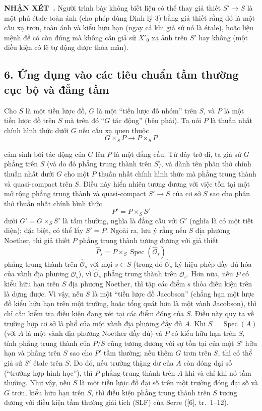 \documentclass[11pt,twoside,openany]{book}
\numberwithin{equation}{section}
\newcommand{\src}[1]{%
  \phantomsection\hypertarget{src:\fgasourceid:#1}{}%
  \marginpar{\raggedleft\footnotesize\sffamily #1}%
}
\newcommand{\fgasourceid}{unset}
\newcommand{\result}[2]{\par\medskip\noindent\textbf{#1\if\relax\detokenize{#2}\relax\else\ #2\fi.}\quad}
\begin{document}
\result{NHẬN XÉT}{} Người trình bày không biết liệu có thể thay giả thiết
$S'\longrightarrow S$ là một phủ étale toàn ánh (cho phép dùng Định lý 3) bằng
giả thiết rằng đó là một cấu xạ trơn, toàn ánh và kiểu hữu hạn (ngay cả khi giả
sử nó là étale), hoặc liệu mệnh đề có còn đúng mà không cần giả sử $X'_0$ xạ
ảnh trên $S'$ hay không (một điều kiện có lẽ tự động được thỏa mãn).

\subsection*{6. Ứng dụng vào các tiêu chuẩn tầm thường cục bộ và đẳng tầm}

Cho $S$ là một tiền lược đồ, $G$ là một ``tiền lược đồ nhóm'' trên $S$, và $P$
là một tiền lược đồ trên $S$ mà trên đó ``$G$ tác động'' (bên phải). Ta nói
$P$ là thuần nhất chính hình thức dưới $G$ nếu cấu xạ quen thuộc
\[
  G\times_SP\longrightarrow P\times_SP
\]

\src{325}
cảm sinh bởi tác động của $G$ lên $P$ là một đẳng cấu. Từ đây trở đi, ta giả
sử $G$ phẳng trên $S$ (và do đó phẳng trung thành trên $S$), và dành tên
phân thớ chính thuần nhất dưới $G$ cho một $P$ thuần nhất chính hình thức
mà phẳng trung thành và quasi-compact trên $S$. Điều này hiển nhiên tương đương
với việc tồn tại một mở rộng phẳng trung thành và quasi-compact
$S'\longrightarrow S$ của cơ sở $S$ sao cho phân thớ thuần nhất chính hình thức
\[
  P'=P\times_SS'
\]
dưới $G'=G\times_SS'$ là tầm thường, nghĩa là đẳng cấu với $G'$ (nghĩa là có
một tiết diện); đặc biệt, có thể lấy $S'=P$. Ngoài ra, lưu ý rằng nếu $S$ địa
phương Noether, thì giả thiết $P$ phẳng trung thành tương đương với
giả thiết
\[
  \widehat P_s=P\times_S\operatorname{Spec}(\widehat{\mathcal O}_s)
\]
phẳng trung thành trên $\widehat{\mathcal O}_s$ với mọi $s\in S$ (trong đó
$\widehat{\mathcal O}_s$ ký hiệu phép đầy đủ hóa của vành địa phương
$\mathcal O_s$), vì $\widehat{\mathcal O}_s$ phẳng trung thành trên
$\mathcal O_s$. Hơn nữa, nếu $P$ có kiểu hữu hạn trên $S$ địa phương Noether,
thì tập các điểm $s$ thỏa điều kiện trên là dựng được. Vì vậy, nếu $S$ là một
``tiền lược đồ Jacobson'' (chẳng hạn một lược đồ kiểu hữu hạn trên một trường,
hoặc tổng quát hơn là một vành Jacobson), thì chỉ cần kiểm tra điều kiện
đang xét tại các điểm đóng của $S$. Điều này quy ta về trường hợp cơ sở là phổ
của một vành địa phương đầy đủ $A$. Khi $S=\operatorname{Spec}(A)$ (với $A$ là
một vành địa phương Noether đầy đủ) và $P$ có kiểu hữu hạn trên $S$, tính phẳng
trung thành của $P/S$ cũng tương đương với sự tồn tại của một $S'$ hữu hạn và
phẳng trên $S$ sao cho $P'$ tầm thường; nếu thêm $G$ trơn trên $S$, thì có thể
giả sử $S'$ étale trên $S$. Do đó, nếu trường thặng dư của $A$ còn đóng đại số
(``trường hợp hình học''), thì $P$ phẳng trung thành trên $A$ khi và chỉ khi nó
tầm thường. Như vậy, nếu $S$ là một tiền lược đồ đại số trên một trường đóng
đại số và $G$ trơn, kiểu hữu hạn trên $S$, thì điều kiện phẳng trung thành trên
$S$ tương đương với điều kiện tầm thường giải tích (SLF) của Serre ([6],
tr.~1--12).
\end{document}
